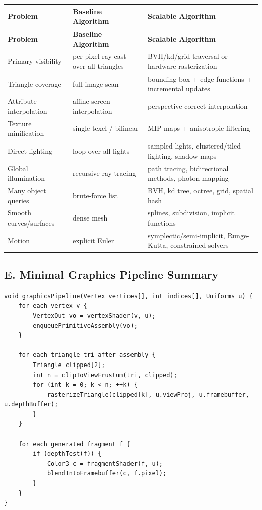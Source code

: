 \documentclass[10pt,letterpaper]{article}
\begin{document}
\begin{longtable}{>{\raggedright\arraybackslash}p{}>{\raggedright\arraybackslash}p{}>{\raggedright\arraybackslash}p{}}
\toprule
\textbf{Problem} & \textbf{Baseline Algorithm} & \textbf{Scalable Algorithm} \\
\midrule\endfirsthead
\toprule
\textbf{Problem} & \textbf{Baseline Algorithm} & \textbf{Scalable Algorithm} \\
\midrule\endhead
Primary visibility & per-pixel ray cast over all triangles & BVH/kd/grid traversal or hardware rasterization \\
Triangle coverage & full image scan & bounding-box + edge functions + incremental updates \\
Attribute interpolation & affine screen interpolation & perspective-correct interpolation \\
Texture minification & single texel / bilinear & MIP maps + anisotropic filtering \\
Direct lighting & loop over all lights & sampled lights, clustered/tiled lighting, shadow maps \\
Global illumination & recursive ray tracing & path tracing, bidirectional methods, photon mapping \\
Many object queries & brute-force list & BVH, kd tree, octree, grid, spatial hash \\
Smooth curves/surfaces & dense mesh & splines, subdivision, implicit functions \\
Motion & explicit Euler & symplectic/semi-implicit, Runge-Kutta, constrained solvers \\
\bottomrule
\end{longtable}

\subsection{E. Minimal Graphics Pipeline Summary}

\begin{verbatim}
void graphicsPipeline(Vertex vertices[], int indices[], Uniforms u) {
    for each vertex v {
        VertexOut vo = vertexShader(v, u);
        enqueuePrimitiveAssembly(vo);
    }

    for each triangle tri after assembly {
        Triangle clipped[2];
        int n = clipToViewFrustum(tri, clipped);
        for (int k = 0; k < n; ++k) {
            rasterizeTriangle(clipped[k], u.viewProj, u.framebuffer, u.depthBuffer);
        }
    }

    for each generated fragment f {
        if (depthTest(f)) {
            Color3 c = fragmentShader(f, u);
            blendIntoFramebuffer(c, f.pixel);
        }
    }
}
\end{verbatim}
\end{document}
